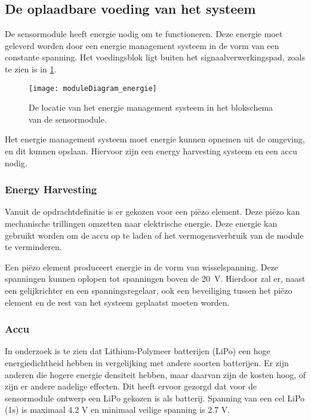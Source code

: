 

\subsection{De oplaadbare voeding van het systeem} \label{sec:energy}
De sensormodule heeft energie nodig om te functioneren. Deze energie moet geleverd worden door een energie management systeem in de vorm van een constante spanning. Het voedingsblok ligt buiten het signaalverwerkingspad, zoals te zien is in \cref{fig:moduleDiagram_energie}.

\begin{figure}[!htbp]
    \centering
    \texttt{[image: moduleDiagram\_energie]}
    \caption{De locatie van het energie management systeem in het blokschema van de sensormodule.}
    \label{fig:moduleDiagram_energie}
\end{figure}

Het energie management systeem moet energie kunnen opnemen uit de omgeving, en dit kunnen opslaan. Hiervoor zijn een energy harvesting systeem en een accu nodig.

\subsubsection{Energy Harvesting} \label{sec:harvesting}

Vanuit de opdrachtdefinitie is er gekozen voor een piëzo element. Deze piëzo kan mechanische trillingen omzetten naar elektrische energie. Deze energie kan gebruikt worden om de accu op te laden of het vermogensverbruik van de module te verminderen.

Een piëzo element produceert energie in de vorm van wisselspanning. Deze spanningen kunnen oplopen tot spanningen boven de \qty{20}{\volt}.%
Hierdoor zal er, naast een gelijkrichter en een spanningsregelaar, ook een beveiliging tussen het piëzo element en de rest van het systeem geplaatst moeten worden.


\subsubsection{Accu} \label{sec:batterijOntwerp}
In onderzoek \cite{BatteryComparison} is te zien dat Lithium-Polymeer batterijen (LiPo) een hoge energiedichtheid hebben in vergelijking met andere soorten batterijen. Er zijn anderen die hogere energie densiteit hebben, maar daarvan zijn de kosten hoog, of zijn er andere nadelige effecten\cite{BatteryComparison}. Dit heeft ervoor gezorgd dat voor de sensormodule ontwerp een LiPo gekozen is als batterij. Spanning van een cel LiPo (1s) is maximaal 4.2 V en minimaal veilige spanning is 2.7 V\cite{BatteryComparison}.


